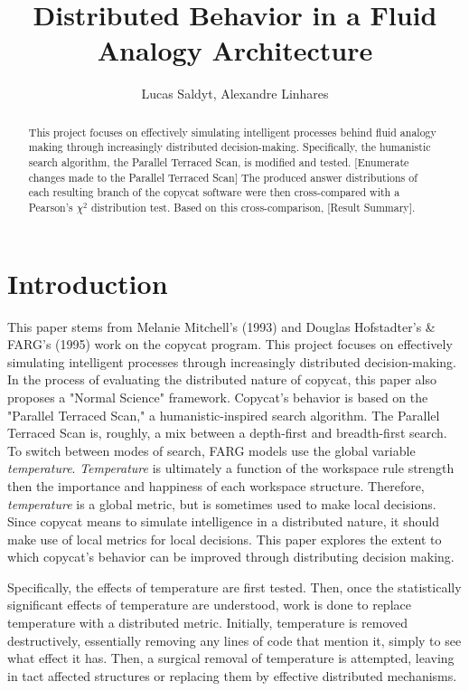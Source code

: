 \documentclass[a4paper]{article}
\title{Distributed Behavior in a Fluid Analogy Architecture}
\author{Lucas Saldyt, Alexandre Linhares}
\begin{document}
\maketitle

\begin{abstract}
This project focuses on effectively simulating intelligent processes behind fluid analogy making through increasingly distributed decision-making.
Specifically, the humanistic search algorithm, the Parallel Terraced Scan, is modified and tested.
[Enumerate changes made to the Parallel Terraced Scan]
The produced answer distributions of each resulting branch of the copycat software were then cross-compared with a Pearson's $\chi^2$ distribution test.
Based on this cross-comparison, [Result Summary].
\end{abstract}

\section{Introduction}

This paper stems from Melanie Mitchell's (1993) and Douglas Hofstadter's \& FARG's (1995) work on the copycat program. 
This project focuses on effectively simulating intelligent processes through increasingly distributed decision-making.
In the process of evaluating the distributed nature of copycat, this paper also proposes a "Normal Science" framework. 
Copycat's behavior is based on the "Parallel Terraced Scan," a humanistic-inspired search algorithm.
The Parallel Terraced Scan is, roughly, a mix between a depth-first and breadth-first search.
To switch between modes of search, FARG models use the global variable \emph{temperature}.
\emph{Temperature} is ultimately a function of the workspace rule strength then the importance and happiness of each workspace structure.
Therefore, \emph{temperature} is a global metric, but is sometimes used to make local decisions.
Since copycat means to simulate intelligence in a distributed nature, it should make use of local metrics for local decisions.
This paper explores the extent to which copycat's behavior can be improved through distributing decision making.

Specifically, the effects of temperature are first tested. 
Then, once the statistically significant effects of temperature are understood, work is done to replace temperature with a distributed metric.
Initially, temperature is removed destructively, essentially removing any lines of code that mention it, simply to see what effect it has.
Then, a surgical removal of temperature is attempted, leaving in tact affected structures or replacing them by effective distributed mechanisms.
\end{document}
